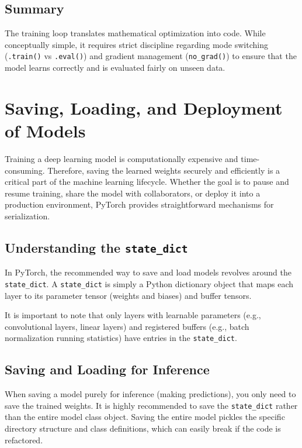 \documentclass[12pt,a4paper]{report}
\begin{document}
\subsection{Summary}
The training loop translates mathematical optimization into code. While conceptually simple, it requires strict discipline regarding mode switching (\texttt{.train()} vs \texttt{.eval()}) and gradient management (\texttt{no\_grad()}) to ensure that the model learns correctly and is evaluated fairly on unseen data.

\section{Saving, Loading, and Deployment of Models}

Training a deep learning model is computationally expensive and time-consuming. Therefore, saving the learned weights securely and efficiently is a critical part of the machine learning lifecycle. Whether the goal is to pause and resume training, share the model with collaborators, or deploy it into a production environment, PyTorch provides straightforward mechanisms for serialization.

\subsection{Understanding the \texttt{state\_dict}}
In PyTorch, the recommended way to save and load models revolves around the \texttt{state\_dict}. A \texttt{state\_dict} is simply a Python dictionary object that maps each layer to its parameter tensor (weights and biases) and buffer tensors. 



It is important to note that only layers with learnable parameters (e.g., convolutional layers, linear layers) and registered buffers (e.g., batch normalization running statistics) have entries in the \texttt{state\_dict}.

\subsection{Saving and Loading for Inference}
When saving a model purely for inference (making predictions), you only need to save the trained weights. It is highly recommended to save the \texttt{state\_dict} rather than the entire model class object. Saving the entire model pickles the specific directory structure and class definitions, which can easily break if the code is refactored.
\end{document}
